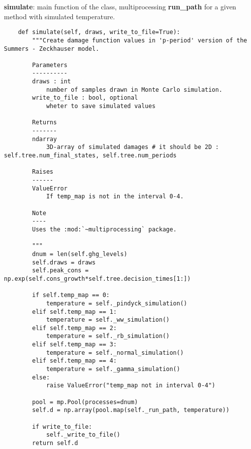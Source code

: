 \documentclass[12pt]{article}
\begin{document}
\textbf{simulate}: main function of the class, multiprocessing \textbf{run\_path} for a given method with simulated temperature.

\begin{verbatim}
    def simulate(self, draws, write_to_file=True):
        """Create damage function values in 'p-period' version of the Summers - Zeckhauser model.

        Parameters
        ----------
        draws : int
            number of samples drawn in Monte Carlo simulation.
        write_to_file : bool, optional
            wheter to save simulated values

        Returns
        -------
        ndarray
            3D-array of simulated damages # it should be 2D : self.tree.num_final_states, self.tree.num_periods

        Raises
        ------
        ValueError
            If temp_map is not in the interval 0-4.

        Note
        ----
        Uses the :mod:`~multiprocessing` package.

        """
        dnum = len(self.ghg_levels)
        self.draws = draws
        self.peak_cons = np.exp(self.cons_growth*self.tree.decision_times[1:])

        if self.temp_map == 0:
            temperature = self._pindyck_simulation()
        elif self.temp_map == 1:
            temperature = self._ww_simulation()
        elif self.temp_map == 2:
            temperature = self._rb_simulation()
        elif self.temp_map == 3:
            temperature = self._normal_simulation()
        elif self.temp_map == 4:
            temperature = self._gamma_simulation()
        else:
            raise ValueError("temp_map not in interval 0-4")

        pool = mp.Pool(processes=dnum)
        self.d = np.array(pool.map(self._run_path, temperature))

        if write_to_file:
            self._write_to_file()
        return self.d
\end{verbatim}
\end{document}
